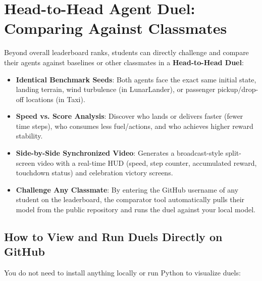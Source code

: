 \documentclass[11pt,a4paper]{article}
\begin{document}
\section{Head-to-Head Agent Duel: Comparing Against Classmates}
\label{sec:duel}

Beyond overall leaderboard ranks, students can directly challenge and compare their agents against baselines or other classmates in a \textbf{Head-to-Head Duel}:

\begin{itemize}
    \item \textbf{Identical Benchmark Seeds}: Both agents face the exact same initial state, landing terrain, wind turbulence (in LunarLander), or passenger pickup/drop-off locations (in Taxi).
    \item \textbf{Speed vs. Score Analysis}: Discover who lands or delivers faster (fewer time steps), who consumes less fuel/actions, and who achieves higher reward stability.
    \item \textbf{Side-by-Side Synchronized Video}: Generates a broadcast-style split-screen video with a real-time HUD (speed, step counter, accumulated reward, touchdown status) and celebration victory screens.
    \item \textbf{Challenge Any Classmate}: By entering the GitHub username of any student on the leaderboard, the comparator tool automatically pulls their model from the public repository and runs the duel against your local model.
\end{itemize}

\subsection*{How to View and Run Duels Directly on GitHub}

You do not need to install anything locally or run Python to visualize duels:
\end{document}
